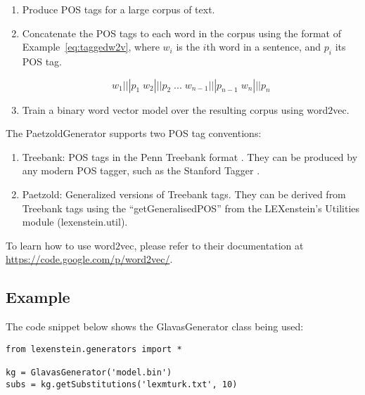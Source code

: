 	\begin{enumerate}
		\item Produce POS tags for a large corpus of text.
		\item Concatenate the POS tags to each word in the corpus using the format of Example~\ref{eq:taggedw2v}, where $w_{i}$ is the $i$th word in a sentence, and $p_{i}$ its POS tag.
			
		\begin{equation}
			\label{eq:taggedw2v}
				w_{1}|||p_{1}\; w_{2}|||p_{2}\;  ...\; w_{n-1}|||p_{n-1}\; w_{n}|||p_{n}
			\end{equation}
				
		\item Train a binary word vector model over the resulting corpus using word$2$vec.
	\end{enumerate}

The PaetzoldGenerator supports two POS tag conventions:
		
			\begin{enumerate}
				\item Treebank: POS tags in the Penn Treebank format \cite{Marcus1993}. They can be produced by any modern POS tagger, such as the Stanford Tagger \cite{stanfordparser}.
				
				\item Paetzold: Generalized versions of Treebank tags. They can be derived from Treebank tags using the ``getGeneralisedPOS'' from the LEXenstein's Utilities module (lexenstein.util).
			\end{enumerate}

To learn how to use word$2$vec, please refer to their documentation at \url{https://code.google.com/p/word2vec/}.



\subsection{Example}

The code snippet below shows the GlavasGenerator class being used:

\begin{lstlisting}
from lexenstein.generators import *

kg = GlavasGenerator('model.bin')
subs = kg.getSubstitutions('lexmturk.txt', 10)
\end{lstlisting}











